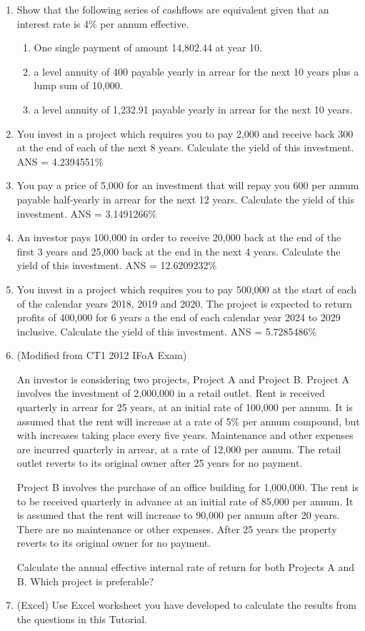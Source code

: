 \documentclass[
]{article}
\theoremstyle{definition}
\theoremstyle{definition}
\theoremstyle{definition}
\theoremstyle{definition}
\theoremstyle{remark}
\begin{document}
\begin{enumerate}
\def\labelenumi{\arabic{enumi}.}
\item
  Show that the following series of cashflows are equivalent given
  that an interest rate is 4\% per annum effective.

  \begin{enumerate}
  \def\labelenumii{\arabic{enumii}.}
  \item
    One single payment of amount 14,802.44 at year 10.
  \item
    a level annuity of 400 payable yearly in arrear for the next 10
    years plus a lump sum of 10,000.
  \item
    a level annuity of 1,232.91 payable yearly in arrear for the
    next 10 years.
  \end{enumerate}
\item
  You invest in a project which requires you to pay 2,000 and receive
  back 300 at the end of each of the next 8 years. Calculate the yield
  of this investment. ANS = 4.2394551\%
\item
  You pay a price of 5,000 for an investment that will repay you 600
  per annum payable half-yearly in arrear for the next 12 years.
  Calculate the yield of this investment. ANS = 3.1491266\%
\item
  An investor pays 100,000 in order to receive 20,000 back at the end
  of the first 3 years and 25,000 back at the end in the next 4 years.
  Calculate the yield of this investment. ANS = 12.6209232\%
\item
  You invest in a project which requires you to pay 500,000 at the
  start of each of the calendar years 2018, 2019 and 2020. The project
  is expected to return profits of 400,000 for 6 years a the end of
  each calendar year 2024 to 2029 inclusive. Calculate the yield of
  this investment. ANS = 5.7285486\%
\item
  (Modified from CT1 2012 IFoA Exam)

  An investor is considering two projects, Project A and Project B.
  Project A involves the investment of 2,000,000 in a retail outlet.
  Rent is received quarterly in arrear for 25 years, at an initial
  rate of 100,000 per annum. It is assumed that the rent will increase
  at a rate of 5\% per annum compound, but with increases taking place
  every five years. Maintenance and other expenses are incurred
  quarterly in arrear, at a rate of 12,000 per annum. The retail
  outlet reverts to its original owner after 25 years for no payment.

  Project B involves the purchase of an office building for 1,000,000.
  The rent is to be received quarterly in advance at an initial rate
  of 85,000 per annum. It is assumed that the rent will increase to
  90,000 per annum after 20 years. There are no maintenance or other
  expenses. After 25 years the property reverts to its original owner
  for no payment.

  Calculate the annual effective internal rate of return for both
  Projects A and B. Which project is preferable?
\item
  (Excel) Use Excel worksheet you have developed to calculate the
  results from the questions in this Tutorial.
\end{enumerate}
\end{document}
